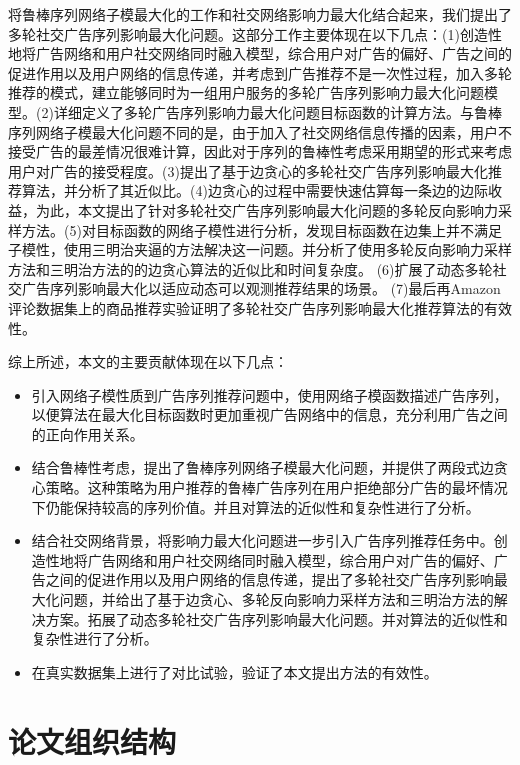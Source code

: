 将鲁棒序列网络子模最大化的工作和社交网络影响力最大化结合起来，我们提出了多轮社交广告序列影响最大化问题。这部分工作主要体现在以下几点：(1)创造性地将广告网络和用户社交网络同时融入模型，综合用户对广告的偏好、广告之间的促进作用以及用户网络的信息传递，并考虑到广告推荐不是一次性过程，加入多轮推荐的模式，建立能够同时为一组用户服务的多轮广告序列影响力最大化问题模型。(2)详细定义了多轮广告序列影响力最大化问题目标函数的计算方法。与鲁棒序列网络子模最大化问题不同的是，由于加入了社交网络信息传播的因素，用户不接受广告的最差情况很难计算，因此对于序列的鲁棒性考虑采用期望的形式来考虑用户对广告的接受程度。(3)提出了基于边贪心的多轮社交广告序列影响最大化推荐算法，并分析了其近似比。(4)边贪心的过程中需要快速估算每一条边的边际收益，为此，本文提出了针对多轮社交广告序列影响最大化问题的多轮反向影响力采样方法。(5)对目标函数的网络子模性进行分析，发现目标函数在边集上并不满足子模性，使用三明治夹逼的方法解决这一问题。并分析了使用多轮反向影响力采样方法和三明治方法的的边贪心算法的近似比和时间复杂度。
(6)扩展了动态多轮社交广告序列影响最大化以适应动态可以观测推荐结果的场景。
(7)最后再Amazon评论数据集\cite{amazon24}上的商品推荐实验证明了多轮社交广告序列影响最大化推荐算法的有效性。

综上所述，本文的主要贡献体现在以下几点：

\begin{itemize}
\item 引入网络子模性质到广告序列推荐问题中，使用网络子模函数描述广告序列，以便算法在最大化目标函数时更加重视广告网络中的信息，充分利用广告之间的正向作用关系。
\item 结合鲁棒性考虑，提出了鲁棒序列网络子模最大化问题，并提供了两段式边贪心策略。这种策略为用户推荐的鲁棒广告序列在用户拒绝部分广告的最坏情况下仍能保持较高的序列价值。并且对算法的近似性和复杂性进行了分析。
\item 结合社交网络背景，将影响力最大化问题进一步引入广告序列推荐任务中。创造性地将广告网络和用户社交网络同时融入模型，综合用户对广告的偏好、广告之间的促进作用以及用户网络的信息传递，提出了多轮社交广告序列影响最大化问题，并给出了基于边贪心、多轮反向影响力采样方法和三明治方法的解决方案。拓展了动态多轮社交广告序列影响最大化问题。并对算法的近似性和复杂性进行了分析。
\item 在真实数据集上进行了对比试验，验证了本文提出方法的有效性。
\end{itemize}


\section{论文组织结构}

